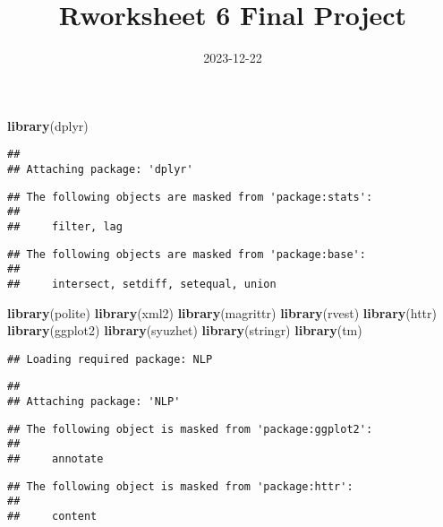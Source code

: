 \documentclass[
]{article}
\title{Rworksheet 6 Final Project}
\author{}
\date{\vspace{-2.5em}2023-12-22}
\newenvironment{Shaded}{\begin{snugshade}}{\end{snugshade}}
\newcommand{\FunctionTok}[1]{\textcolor[rgb]{0.13,0.29,0.53}{\textbf{#1}}}
\newcommand{\NormalTok}[1]{#1}
\begin{document}
\maketitle

\begin{Shaded}
\begin{Highlighting}[]
\FunctionTok{library}\NormalTok{(dplyr)}
\end{Highlighting}
\end{Shaded}

\begin{verbatim}
## 
## Attaching package: 'dplyr'
\end{verbatim}

\begin{verbatim}
## The following objects are masked from 'package:stats':
## 
##     filter, lag
\end{verbatim}

\begin{verbatim}
## The following objects are masked from 'package:base':
## 
##     intersect, setdiff, setequal, union
\end{verbatim}

\begin{Shaded}
\begin{Highlighting}[]
\FunctionTok{library}\NormalTok{(polite)}
\FunctionTok{library}\NormalTok{(xml2)}
\FunctionTok{library}\NormalTok{(magrittr)}
\FunctionTok{library}\NormalTok{(rvest)}
\FunctionTok{library}\NormalTok{(httr)}
\FunctionTok{library}\NormalTok{(ggplot2)}
\FunctionTok{library}\NormalTok{(syuzhet)}
\FunctionTok{library}\NormalTok{(stringr)}
\FunctionTok{library}\NormalTok{(tm)}
\end{Highlighting}
\end{Shaded}

\begin{verbatim}
## Loading required package: NLP
\end{verbatim}

\begin{verbatim}
## 
## Attaching package: 'NLP'
\end{verbatim}

\begin{verbatim}
## The following object is masked from 'package:ggplot2':
## 
##     annotate
\end{verbatim}

\begin{verbatim}
## The following object is masked from 'package:httr':
## 
##     content
\end{verbatim}
\end{document}
